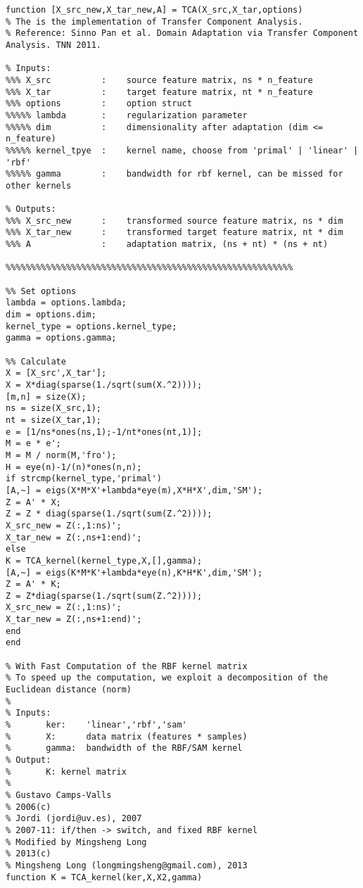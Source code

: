 \begin{lstlisting}[title=TCA方法的Matlab实现, frame=shadowbox]
function [X_src_new,X_tar_new,A] = TCA(X_src,X_tar,options)
% The is the implementation of Transfer Component Analysis.
% Reference: Sinno Pan et al. Domain Adaptation via Transfer Component Analysis. TNN 2011.

% Inputs: 
%%% X_src          :    source feature matrix, ns * n_feature
%%% X_tar          :    target feature matrix, nt * n_feature
%%% options        :    option struct
%%%%% lambda       :    regularization parameter
%%%%% dim          :    dimensionality after adaptation (dim <= n_feature)
%%%%% kernel_tpye  :    kernel name, choose from 'primal' | 'linear' | 'rbf'
%%%%% gamma        :    bandwidth for rbf kernel, can be missed for other kernels

% Outputs: 
%%% X_src_new      :    transformed source feature matrix, ns * dim
%%% X_tar_new      :    transformed target feature matrix, nt * dim
%%% A              :    adaptation matrix, (ns + nt) * (ns + nt)

%%%%%%%%%%%%%%%%%%%%%%%%%%%%%%%%%%%%%%%%%%%%%%%%%%%%%%%%%

%% Set options
lambda = options.lambda;              
dim = options.dim;                    
kernel_type = options.kernel_type;    
gamma = options.gamma;                

%% Calculate
X = [X_src',X_tar'];
X = X*diag(sparse(1./sqrt(sum(X.^2))));
[m,n] = size(X);
ns = size(X_src,1);
nt = size(X_tar,1);
e = [1/ns*ones(ns,1);-1/nt*ones(nt,1)];
M = e * e';
M = M / norm(M,'fro');
H = eye(n)-1/(n)*ones(n,n);
if strcmp(kernel_type,'primal')
[A,~] = eigs(X*M*X'+lambda*eye(m),X*H*X',dim,'SM');
Z = A' * X;
Z = Z * diag(sparse(1./sqrt(sum(Z.^2))));
X_src_new = Z(:,1:ns)';
X_tar_new = Z(:,ns+1:end)';
else
K = TCA_kernel(kernel_type,X,[],gamma);
[A,~] = eigs(K*M*K'+lambda*eye(n),K*H*K',dim,'SM');
Z = A' * K;
Z = Z*diag(sparse(1./sqrt(sum(Z.^2))));
X_src_new = Z(:,1:ns)';
X_tar_new = Z(:,ns+1:end)';
end
end

% With Fast Computation of the RBF kernel matrix
% To speed up the computation, we exploit a decomposition of the Euclidean distance (norm)
%
% Inputs:
%       ker:    'linear','rbf','sam'
%       X:      data matrix (features * samples)
%       gamma:  bandwidth of the RBF/SAM kernel
% Output:
%       K: kernel matrix
%
% Gustavo Camps-Valls
% 2006(c)
% Jordi (jordi@uv.es), 2007
% 2007-11: if/then -> switch, and fixed RBF kernel
% Modified by Mingsheng Long
% 2013(c)
% Mingsheng Long (longmingsheng@gmail.com), 2013
function K = TCA_kernel(ker,X,X2,gamma)


\end{lstlisting}
